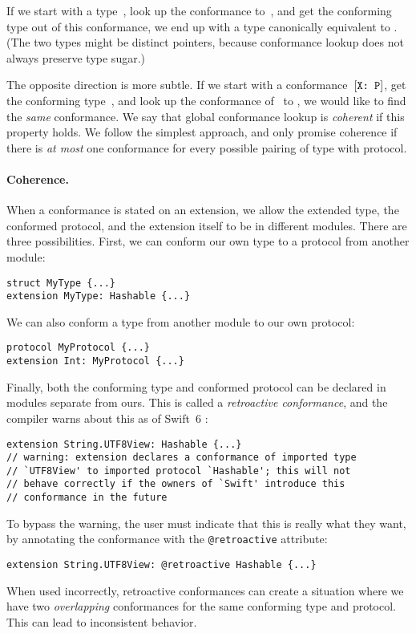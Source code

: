 \documentclass[../generics]{subfiles}
\begin{document}
If we start with a type~\tX, look up the conformance to~\tP, and get the conforming type out of this conformance, we end up with a type canonically equivalent to \tX. (The two types might be distinct pointers, because conformance lookup does not always preserve type sugar.)

The opposite direction is more subtle. If we start with a conformance~$[\texttt{X:~P}]$, get the conforming type~\tX, and look up the conformance of \tX\ to \tP, we would like to find the \emph{same} conformance. We say that global conformance lookup is \emph{coherent} if this property holds. We follow the simplest approach, and only promise coherence if there is \emph{at most} one conformance for every possible pairing of type with protocol.

\paragraph{Coherence.} When a conformance is stated on an extension, we allow the extended type, the conformed protocol, and the extension itself to be in different modules. There are three possibilities. First, we can conform our own type to a protocol from another module:
\begin{Verbatim}
struct MyType {...}
extension MyType: Hashable {...}
\end{Verbatim}
We can also conform a type from another module to our own protocol:
\begin{Verbatim}
protocol MyProtocol {...}
extension Int: MyProtocol {...}
\end{Verbatim}
Finally, both the conforming type and conformed protocol can be declared in modules separate from ours. This is called a \emph{retroactive conformance}, and the compiler warns about this as of Swift~6 \cite{se0364}:
\begin{Verbatim}
extension String.UTF8View: Hashable {...}
// warning: extension declares a conformance of imported type
// `UTF8View' to imported protocol `Hashable'; this will not
// behave correctly if the owners of `Swift' introduce this
// conformance in the future
\end{Verbatim}
To bypass the warning, the user must indicate that this is really what they want, by annotating the conformance with the \texttt{@retroactive} attribute:
\begin{Verbatim}
extension String.UTF8View: @retroactive Hashable {...}
\end{Verbatim}
When used incorrectly, retroactive conformances can create a situation where we have two \emph{overlapping} conformances for the same conforming type and protocol. This can lead to inconsistent behavior.
\end{document}
